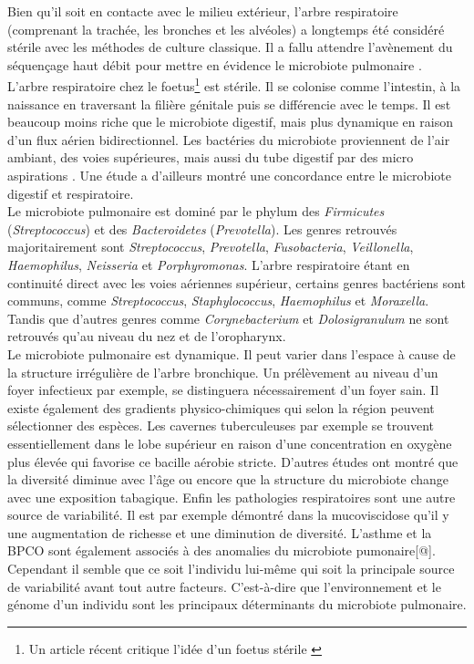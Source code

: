 \documentclass[12pt,a4paper]{article}
\begin{document}
Bien qu'il soit en contacte avec le milieu extérieur, l’arbre respiratoire (comprenant la trachée, les bronches et les alvéoles) a longtemps été considéré stérile avec les méthodes de culture classique. Il a fallu attendre l’avènement du séquençage haut débit pour mettre en évidence le microbiote pulmonaire \cite{HoMan2017,Beck,Dicksonb}.\\
L'arbre respiratoire chez le foetus\footnote{Un article récent critique l'idée d'un foetus stérile \cite{Perez-Munoz2017}} est stérile. Il se colonise comme l'intestin, à la naissance en traversant la filière génitale puis se différencie avec le temps. Il est beaucoup moins riche que le microbiote digestif, mais plus dynamique en raison d'un flux aérien bidirectionnel.  Les bactéries du microbiote proviennent de l’air ambiant, des voies supérieures,  mais aussi du tube digestif par des micro aspirations \cite{Dickson}. Une étude a d'ailleurs montré une concordance entre le microbiote digestif et respiratoire\cite{Dickson}.\\
Le microbiote pulmonaire est dominé par le phylum des \textit{Firmicutes} (\textit{Streptococcus}) et des \textit{Bacteroidetes} (\textit{Prevotella}). Les genres retrouvés majoritairement sont \textit{Streptococcus}, \textit{Prevotella}, \textit{Fusobacteria}, \textit{Veillonella}, \textit{Haemophilus}, \textit{Neisseria} et \textit{Porphyromonas}.
L’arbre respiratoire étant en continuité direct avec les voies aériennes supérieur, certains genres bactériens sont communs, comme \textit{Streptococcus}, \textit{Staphylococcus}, \textit{Haemophilus} et \textit{Moraxella}. Tandis que d’autres genres comme \textit{Corynebacterium} et \textit{Dolosigranulum} ne sont retrouvés qu’au niveau du nez et de l'oropharynx. \\
Le microbiote pulmonaire est dynamique. Il peut varier dans l'espace à cause de la structure irrégulière de l'arbre bronchique. Un prélèvement au niveau d'un foyer infectieux par exemple, se distinguera nécessairement d'un foyer sain. Il existe également des gradients physico-chimiques qui selon la région peuvent sélectionner des espèces. Les cavernes tuberculeuses par exemple se trouvent essentiellement dans le lobe supérieur en raison d'une concentration en oxygène plus élevée qui favorise ce bacille aérobie stricte. D'autres études \cite{Frayman2017,Coburn2015} ont montré que la diversité diminue avec l'âge ou encore que la structure du microbiote change avec une exposition tabagique. 
Enfin les pathologies respiratoires\cite{HoMan2017} sont une autre source de variabilité. Il est par exemple démontré dans la mucoviscidose qu'il y une augmentation de richesse et une diminution de diversité. L'asthme et la BPCO sont également associés à des anomalies du microbiote pumonaire[@].  \\
Cependant il semble que ce soit l'individu lui-même  qui soit la principale source de variabilité avant tout autre facteurs\cite{Whelan2017}. C'est-à-dire que l'environnement et le génome d'un individu sont les principaux déterminants du microbiote pulmonaire.
\end{document}
